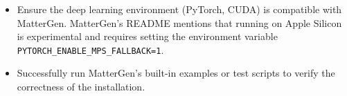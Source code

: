 \documentclass[letterpaper]{article} %
\begin{document}
\begin{itemize}
    \item Ensure the deep learning environment (PyTorch, CUDA) is compatible with MatterGen. MatterGen's README mentions that running on Apple Silicon is experimental and requires setting the environment variable \texttt{PYTORCH\_ENABLE\_MPS\_FALLBACK=1}.
    \item Successfully run MatterGen's built-in examples or test scripts to verify the correctness of the installation.
\end{itemize}

\end{document}
